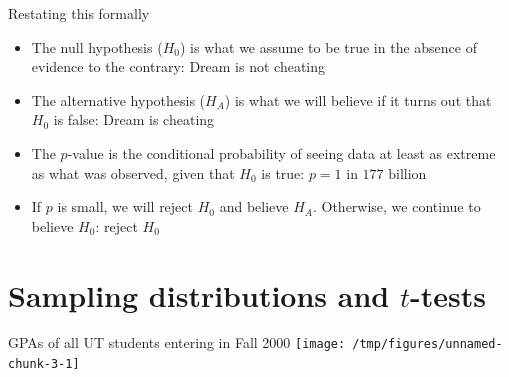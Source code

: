 \documentclass{beamer}\usepackage[]{graphicx}\usepackage[]{color}
\makeatletter
\newcommand{\hlnum}[1]{\textcolor[rgb]{0.824,0.412,0.118}{#1}}%
\newcommand{\hlopt}[1]{\textcolor[rgb]{1,0.894,0.769}{#1}}%
\newcommand{\hlstd}[1]{\textcolor[rgb]{1,0.894,0.769}{#1}}%
\newcommand{\hlkwb}[1]{\textcolor[rgb]{0.804,0.776,0.451}{#1}}%
\newcommand{\hlkwd}[1]{\textcolor[rgb]{1,0.78,0.769}{#1}}%
\newenvironment{kframe}{%
 \def\at@end@of@kframe{}%
 \ifinner\ifhmode%
  \def\at@end@of@kframe{\end{minipage}}%
  \begin{minipage}{\columnwidth}%
 \fi\fi%
 \def\FrameCommand##1{\hskip\@totalleftmargin \hskip-\fboxsep
 \colorbox{shadecolor}{##1}\hskip-\fboxsep
     \hskip-\linewidth \hskip-\@totalleftmargin \hskip\columnwidth}%
 \MakeFramed {\advance\hsize-\width
   \@totalleftmargin\z@ \linewidth\hsize
   \@setminipage}}%
 {\par\unskip\endMakeFramed%
 \at@end@of@kframe}
\newenvironment{knitrout}{}{} %
\makeatother
\begin{document}
\begin{darkframes}
    \begin{frame}{Restating this formally}
      \begin{itemize}[<+->]
        \item The \alert{null hypothesis} ($H_0$) is what we assume to be true in the absence of evidence to the contrary: \alert{Dream is not cheating}
        \item The \alert{alternative hypothesis} ($H_A$) is what we will believe if it turns out that $H_0$ is false: \alert{Dream is cheating}
        \item The $p$-value is the conditional probability of seeing data at least as extreme as what was observed, given that $H_0$ is true: \alert{$p=\text{1 in 177 billion}$}
        \item If $p$ is small, we will reject $H_0$ and believe $H_A$. Otherwise, we continue to believe $H_0$: \alert{reject $H_0$}
      \end{itemize}
    \end{frame}

    \section{Sampling distributions and $t$-tests}

    \begin{frame}[fragile]{GPAs of all UT students entering in Fall 2000}
\begin{knitrout}
\color{fgcolor}
\texttt{[image: /tmp/figures/unnamed-chunk-3-1]} 

\end{knitrout}
    \end{frame}
      
      
      

\end{darkframes}
\end{document}
